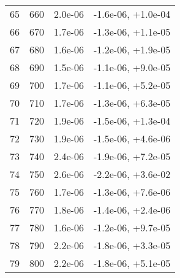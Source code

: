 \begin{table}
\begin{adjustbox}{width=1\textwidth/2}
\begin{tabular}{|c|c|c|c|}
\cline{1-4}
65 & 660 & 2.0e-06 & -1.6e-06, +1.0e-04 \\
\cline{1-4}
66 & 670 & 1.7e-06 & -1.3e-06, +1.1e-05 \\
\cline{1-4}
67 & 680 & 1.6e-06 & -1.2e-06, +1.9e-05 \\
\cline{1-4}
68 & 690 & 1.5e-06 & -1.1e-06, +9.0e-05 \\
\cline{1-4}
69 & 700 & 1.7e-06 & -1.1e-06, +5.2e-05 \\
\cline{1-4}
70 & 710 & 1.7e-06 & -1.3e-06, +6.3e-05 \\
\cline{1-4}
71 & 720 & 1.9e-06 & -1.5e-06, +1.3e-04 \\
\cline{1-4}
72 & 730 & 1.9e-06 & -1.5e-06, +4.6e-06 \\
\cline{1-4}
73 & 740 & 2.4e-06 & -1.9e-06, +7.2e-05 \\
\cline{1-4}
74 & 750 & 2.6e-06 & -2.2e-06, +3.6e-02 \\
\cline{1-4}
75 & 760 & 1.7e-06 & -1.3e-06, +7.6e-06 \\
\cline{1-4}
76 & 770 & 1.8e-06 & -1.4e-06, +2.4e-06 \\
\cline{1-4}
77 & 780 & 1.6e-06 & -1.2e-06, +9.7e-05 \\
\cline{1-4}
78 & 790 & 2.2e-06 & -1.8e-06, +3.3e-05 \\
\cline{1-4}
79 & 800 & 2.2e-06 & -1.8e-06, +5.1e-05 \\
\cline{1-4}
\end{tabular}
\end{adjustbox}
\end{table}


